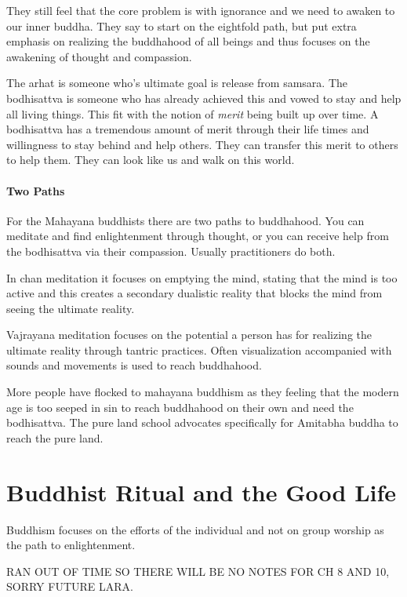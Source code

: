 \documentclass{article}
\begin{document}
They still feel that the core problem is with ignorance and we need to awaken to our inner buddha. They say to start on the eightfold path, but put extra emphasis on realizing the buddhahood of all beings and thus focuses on the awakening of thought and compassion.

The arhat is someone who's ultimate goal is release from samsara. The bodhisattva is someone who has already achieved this and vowed to stay and help all living things. This fit with the notion of \emph{merit} being built up over time. A bodhisattva has a tremendous amount of merit through their life times and willingness to stay behind and help others. They can transfer this merit to others to help them. They can look like us and walk on this world.

\paragraph{Two Paths}
\label{par:two_paths}
For the Mahayana buddhists there are two paths to buddhahood. You can meditate and find enlightenment through thought, or you can receive help from the bodhisattva via their compassion. Usually practitioners do both.

In chan meditation it focuses on emptying the mind, stating that the mind is too active and this creates a secondary dualistic reality that blocks the mind from seeing the ultimate reality.

Vajrayana meditation focuses on the potential a person has for realizing the ultimate reality through tantric practices. Often visualization accompanied with sounds and movements is used to reach buddhahood.

More people have flocked to mahayana buddhism as they feeling that the modern age is too seeped in sin to reach buddhahood on their own and need the bodhisattva. The pure land school advocates specifically for Amitabha buddha to reach the pure land.

\section*{Buddhist Ritual and the Good Life}
\label{sec:buddhist_ritual_and_the_good_life}
Buddhism focuses on the efforts of the individual and not on group worship as the path to enlightenment.



RAN OUT OF TIME SO THERE WILL BE NO NOTES FOR CH 8 AND 10, SORRY FUTURE LARA.
\end{document}
